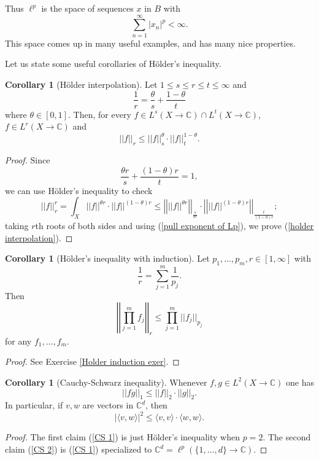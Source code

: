 \documentclass[12pt]{book}
\newcommand{\CC}{\mathbb{C}}
\theoremstyle{definition}
\newtheorem{corollary}[theorem]{Corollary}
\begin{document}
Thus $\ell^p$ is the space of sequences $x$ in $B$ with
$$\sum_{n = 1}^\infty |x_n|^p < \infty.$$
This space comes up in many useful examples, and has many nice properties.

Let us state some useful corollaries of H\"older's inequality.
\begin{corollary}[H\"older interpolation]
Let $1 \leq s \leq r \leq t \leq \infty$ and
$$\frac{1}{r} = \frac{\theta}{s} + \frac{1 - \theta}{t}$$
where $\theta \in [0, 1]$. Then, for every $f \in L^s(X \to \CC) \cap L^t(X \to \CC)$, $f \in L^r(X \to \CC)$ and
\begin{equation}
\label{holder interpolation}
||f||_r \leq ||f||_s^\theta \cdot ||f||_t^{1-\theta}.
\end{equation}
\end{corollary}
\begin{proof}
Since
$$\frac{\theta r}{s} + \frac{(1 - \theta)r}{t} = 1,$$
we can use H\"older's inequality to check
$$||f||_r^r = \int_X ||f||^{\theta r} \cdot ||f||^{(1 - \theta)r} \leq \left|\left|||f||^{\theta r}\right|\right|_{\frac{s}{\theta r}} \cdot \left|\left|||f||^{(1 - \theta) r}\right|\right|_{\frac{t}{(1 - \theta)r}};$$
taking $r$th roots of both sides and using (\ref{pull exponent of Lp}), we prove (\ref{holder interpolation}).
\end{proof}

\begin{corollary}[H\"older's inequality with induction]
\label{Holder induction}
Let $p_1, \dots, p_m, r \in [1, \infty]$ with
$$\frac{1}{r} = \sum_{j=1}^m \frac{1}{p_j}.$$
Then
$$\left|\left|\prod_{j=1}^m f_j\right|\right|_r \leq \prod_{j=1}^m ||f_j||_{p_j}$$
for any $f_1, \dots, f_m$.
\end{corollary}
\begin{proof}
See Exercise \ref{Holder induction exer}.
\end{proof}

\begin{corollary}[Cauchy-Schwarz inequality]
Whenever $f, g \in L^2(X \to \CC)$ one has
\begin{equation}
\label{CS 1}
||fg||_1 \leq ||f||_2 \cdot ||g||_2.
\end{equation}
In particular, if $v, w$ are vectors in $\CC^d$, then
\begin{equation}
\label{CS 2}
|\langle v, w\rangle|^2 \leq \langle v, v\rangle \cdot \langle w, w\rangle.
\end{equation}
\end{corollary}
\begin{proof}
The first claim (\ref{CS 1}) is just H\"older's inequality when $p = 2$.
The second claim (\ref{CS 2}) is (\ref{CS 1}) specialized to $\CC^d = \ell^p(\{1, \dots, d\} \to \CC)$.
\end{proof}
\end{document}
